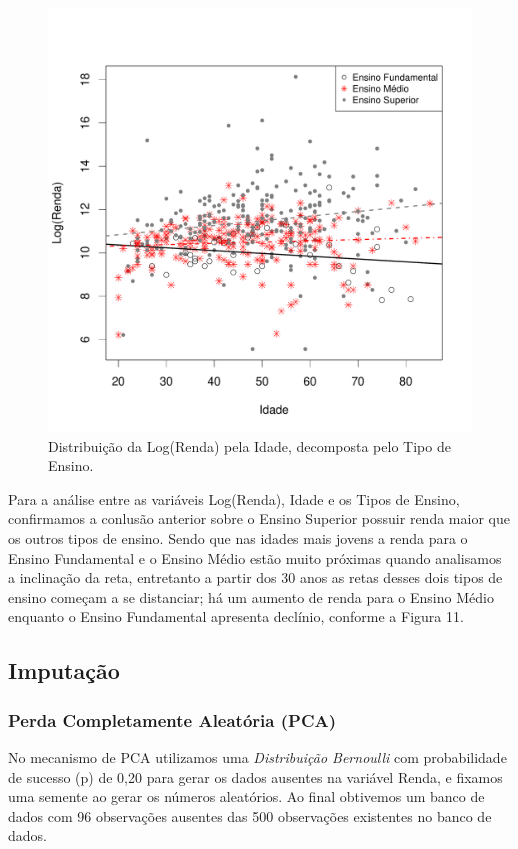 \documentclass[]{article}
\begin{document}
\begin{figure}[H]

{\centering \includegraphics[width=0.6\linewidth]{p22-graf} 

}

\caption{Distribuição da Log(Renda) pela Idade, decomposta pelo Tipo de Ensino.}\label{fig:unnamed-chunk-18}
\end{figure}

Para a análise entre as variáveis Log(Renda), Idade e os Tipos de
Ensino, confirmamos a conlusão anterior sobre o Ensino Superior possuir
renda maior que os outros tipos de ensino. Sendo que nas idades mais
jovens a renda para o Ensino Fundamental e o Ensino Médio estão muito
próximas quando analisamos a inclinação da reta, entretanto a partir dos
30 anos as retas desses dois tipos de ensino começam a se distanciar; há
um aumento de renda para o Ensino Médio enquanto o Ensino Fundamental
apresenta declínio, conforme a Figura 11.

\subsection{Imputação}\label{imputacao}

\subsubsection{Perda Completamente Aleatória
(PCA)}\label{perda-completamente-aleatoria-pca}

No mecanismo de PCA utilizamos uma \emph{Distribuição Bernoulli} com
probabilidade de sucesso (p) de 0,20 para gerar os dados ausentes na
variável Renda, e fixamos uma semente ao gerar os números aleatórios. Ao
final obtivemos um banco de dados com 96 observações ausentes das 500
observações existentes no banco de dados.
\end{document}
